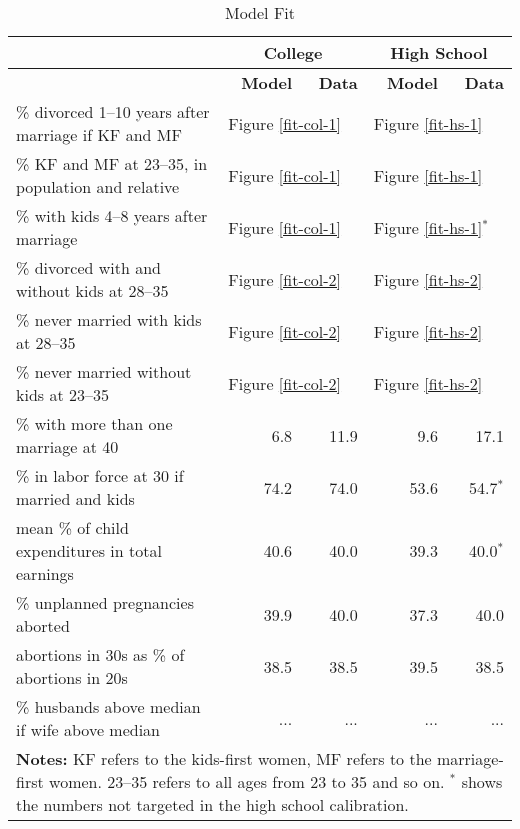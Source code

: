 \documentclass[12pt,letter]{article}
\begin{document}
\def\f#1{\multicolumn{2}{l}{\hspace{0.75cm}Figure #1}}
\begin{table}[h]
\begin{center}
\caption{Model Fit\label{model-fit-table}}
\begin{tabular}{l r r r r}\hline\hline
& \multicolumn{2}{c}{\textbf{College}} & \multicolumn{2}{c}{\textbf{High School}} \\\hline
& \textbf{Model} & \textbf{Data} & \textbf{Model} & \textbf{Data} \\\hline
{\footnotesize {\% divorced 1--10 years after marriage if KF and MF} } & \f{\ref{fit-col-1}} &  \f{\ref{fit-hs-1}} \\
{\footnotesize {\% KF and MF at 23--35, in population and relative} }& \f{\ref{fit-col-1}} &  \f{\ref{fit-hs-1}} \\
{\footnotesize \% with kids 4--8 years after marriage } & \f{\ref{fit-col-1}} &  \f{\ref{fit-hs-1}${}^*$}\\\hline
{\footnotesize \% divorced with and without kids at 28--35 } & \f{\ref{fit-col-2}} &  \f{\ref{fit-hs-2}}\\
{\footnotesize \% never married with kids at 28--35 } & \f{\ref{fit-col-2}} &  \f{\ref{fit-hs-2}}\\
{\footnotesize \% never married without kids at 23--35 } & \f{\ref{fit-col-2}} &  \f{\ref{fit-hs-2}}\\\hline
{\footnotesize  \% with more than one marriage at 40} & 6.8 & 11.9 & 9.6 & 17.1 \\
{\footnotesize \% in labor force at 30 if married and kids} & 74.2 & 74.0 & 53.6 & 54.7${}^*$ \\
{\footnotesize mean \% of child expenditures in total earnings} & 40.6 & 40.0 & 39.3 & 40.0${}^*$ \\
{\footnotesize \% unplanned pregnancies aborted} & 39.9 & 40.0 & 37.3 & 40.0 \\
{\footnotesize abortions in 30s as \% of abortions in 20s} & 38.5 & 38.5 & 39.5 & 38.5 \\
{\footnotesize \% husbands above median if wife above median} & ... & ... & ... & ...\\
\hline
\multicolumn{5}{p{0.85\linewidth}}{\footnotesize \textbf{Notes:} KF refers to the kids-first women, MF refers to the marriage-first women. 23--35 refers to all ages from 23 to 35 and so on. ${}^*$ shows the numbers not targeted in the high school calibration.}\\\hline\hline
\end{tabular}

\end{center}
\end{table}
\end{document}
